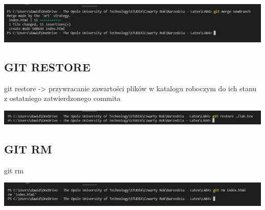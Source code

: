 \documentclass{article} %
\newcommand{\forceindent}{\leavevmode{\parindent=1cm\indent}} %
\begin{document}
\includegraphics[width=18cm]{image/merge.png}
\subsection{GIT RESTORE}
\forceindent git restore -> przywracanie zawartości plików w katalogu roboczym do ich stanu z ostatniego zatwierdzonego commita

\includegraphics[width=18cm]{image/restore.png}
\subsection{GIT RM}
\forceindent git rm

\includegraphics[width=18cm]{image/rm.png}
\end{document}
